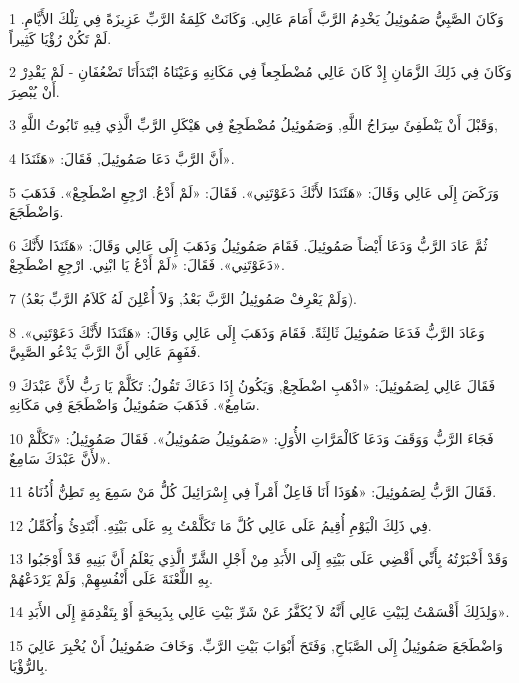 \par 1 وَكَانَ الصَّبِيُّ صَمُوئِيلُ يَخْدِمُ الرَّبَّ أَمَامَ عَالِي. وَكَانَتْ كَلِمَةُ الرَّبِّ عَزِيزَةً فِي تِلْكَ الأَيَّامِ. لَمْ تَكُنْ رُؤْيَا كَثِيراً.
\par 2 وَكَانَ فِي ذَلِكَ الزَّمَانِ إِذْ كَانَ عَالِي مُضْطَجِعاً فِي مَكَانِهِ وَعَيْنَاهُ ابْتَدَأَتَا تَضْعُفَانِ - لَمْ يَقْدِرْ أَنْ يُبْصِرَ.
\par 3 وَقَبْلَ أَنْ يَنْطَفِئَ سِرَاجُ اللَّهِ, وَصَمُوئِيلُ مُضْطَجِعٌ فِي هَيْكَلِ الرَّبِّ الَّذِي فِيهِ تَابُوتُ اللَّهِ,
\par 4 أَنَّ الرَّبَّ دَعَا صَمُوئِيلَ, فَقَالَ: «هَئَنَذَا».
\par 5 وَرَكَضَ إِلَى عَالِي وَقَالَ: «هَئَنَذَا لأَنَّكَ دَعَوْتَنِي». فَقَالَ: «لَمْ أَدْعُ. ارْجِعِ اضْطَجِعْ». فَذَهَبَ وَاضْطَجَعَ.
\par 6 ثُمَّ عَادَ الرَّبُّ وَدَعَا أَيْضاً صَمُوئِيلَ. فَقَامَ صَمُوئِيلُ وَذَهَبَ إِلَى عَالِي وَقَالَ: «هَئَنَذَا لأَنَّكَ دَعَوْتَنِي». فَقَالَ: «لَمْ أَدْعُ يَا ابْنِي. ارْجِعِ اضْطَجِعْ».
\par 7 (وَلَمْ يَعْرِفْ صَمُوئِيلُ الرَّبَّ بَعْدُ, وَلاَ أُعْلِنَ لَهُ كَلاَمُ الرَّبِّ بَعْدُ).
\par 8 وَعَادَ الرَّبُّ فَدَعَا صَمُوئِيلَ ثَالِثَةً. فَقَامَ وَذَهَبَ إِلَى عَالِي وَقَالَ: «هَئَنَذَا لأَنَّكَ دَعَوْتَنِي». فَفَهِمَ عَالِي أَنَّ الرَّبَّ يَدْعُو الصَّبِيَّ.
\par 9 فَقَالَ عَالِي لِصَمُوئِيلَ: «اذْهَبِ اضْطَجِعْ, وَيَكُونُ إِذَا دَعَاكَ تَقُولُ: تَكَلَّمْ يَا رَبُّ لأَنَّ عَبْدَكَ سَامِعٌ». فَذَهَبَ صَمُوئِيلُ وَاضْطَجَعَ فِي مَكَانِهِ.
\par 10 فَجَاءَ الرَّبُّ وَوَقَفَ وَدَعَا كَالْمَرَّاتِ الأُوَلِ: «صَمُوئِيلُ صَمُوئِيلُ». فَقَالَ صَمُوئِيلُ: «تَكَلَّمْ لأَنَّ عَبْدَكَ سَامِعٌ».
\par 11 فَقَالَ الرَّبُّ لِصَمُوئِيلَ: «هُوَذَا أَنَا فَاعِلٌ أَمْراً فِي إِسْرَائِيلَ كُلُّ مَنْ سَمِعَ بِهِ تَطِنُّ أُذُنَاهُ.
\par 12 فِي ذَلِكَ الْيَوْمِ أُقِيمُ عَلَى عَالِي كُلَّ مَا تَكَلَّمْتُ بِهِ عَلَى بَيْتِهِ. أَبْتَدِئُ وَأُكَمِّلُ.
\par 13 وَقَدْ أَخْبَرْتُهُ بِأَنِّي أَقْضِي عَلَى بَيْتِهِ إِلَى الأَبَدِ مِنْ أَجْلِ الشَّرِّ الَّذِي يَعْلَمُ أَنَّ بَنِيهِ قَدْ أَوْجَبُوا بِهِ اللَّعْنَةَ عَلَى أَنْفُسِهِمْ, وَلَمْ يَرْدَعْهُمْ.
\par 14 وَلِذَلِكَ أَقْسَمْتُ لِبَيْتِ عَالِي أَنَّهُ لاَ يُكَفَّرُ عَنْ شَرِّ بَيْتِ عَالِي بِذَبِيحَةٍ أَوْ بِتَقْدِمَةٍ إِلَى الأَبَدِ».
\par 15 وَاضْطَجَعَ صَمُوئِيلُ إِلَى الصَّبَاحِ, وَفَتَحَ أَبْوَابَ بَيْتِ الرَّبِّ. وَخَافَ صَمُوئِيلُ أَنْ يُخْبِرَ عَالِيَ بِالرُّؤْيَا.
